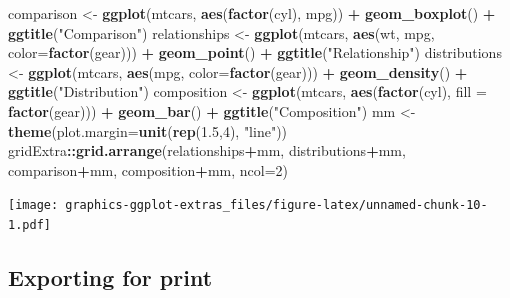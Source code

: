 \documentclass[]{article}
\newenvironment{Shaded}{\begin{snugshade}}{\end{snugshade}}
\newcommand{\DataTypeTok}[1]{\textcolor[rgb]{0.13,0.29,0.53}{#1}}
\newcommand{\DecValTok}[1]{\textcolor[rgb]{0.00,0.00,0.81}{#1}}
\newcommand{\FloatTok}[1]{\textcolor[rgb]{0.00,0.00,0.81}{#1}}
\newcommand{\KeywordTok}[1]{\textcolor[rgb]{0.13,0.29,0.53}{\textbf{#1}}}
\newcommand{\NormalTok}[1]{#1}
\newcommand{\OperatorTok}[1]{\textcolor[rgb]{0.81,0.36,0.00}{\textbf{#1}}}
\newcommand{\StringTok}[1]{\textcolor[rgb]{0.31,0.60,0.02}{#1}}
\begin{document}
\begin{Shaded}
\begin{Highlighting}[]
\NormalTok{comparison <-}\StringTok{ }\KeywordTok{ggplot}\NormalTok{(mtcars, }\KeywordTok{aes}\NormalTok{(}\KeywordTok{factor}\NormalTok{(cyl), mpg)) }\OperatorTok{+}\StringTok{ }\KeywordTok{geom_boxplot}\NormalTok{() }\OperatorTok{+}\StringTok{  }\KeywordTok{ggtitle}\NormalTok{(}\StringTok{"Comparison"}\NormalTok{)}
\NormalTok{relationships <-}\StringTok{ }\KeywordTok{ggplot}\NormalTok{(mtcars, }\KeywordTok{aes}\NormalTok{(wt, mpg, }\DataTypeTok{color=}\KeywordTok{factor}\NormalTok{(gear))) }\OperatorTok{+}\StringTok{ }\KeywordTok{geom_point}\NormalTok{() }\OperatorTok{+}\StringTok{ }\KeywordTok{ggtitle}\NormalTok{(}\StringTok{"Relationship"}\NormalTok{)}
\NormalTok{distributions <-}\StringTok{ }\KeywordTok{ggplot}\NormalTok{(mtcars, }\KeywordTok{aes}\NormalTok{(mpg, }\DataTypeTok{color=}\KeywordTok{factor}\NormalTok{(gear))) }\OperatorTok{+}\StringTok{ }\KeywordTok{geom_density}\NormalTok{() }\OperatorTok{+}\StringTok{ }\KeywordTok{ggtitle}\NormalTok{(}\StringTok{"Distribution"}\NormalTok{)}
\NormalTok{composition <-}\StringTok{ }\KeywordTok{ggplot}\NormalTok{(mtcars, }\KeywordTok{aes}\NormalTok{(}\KeywordTok{factor}\NormalTok{(cyl), }\DataTypeTok{fill =} \KeywordTok{factor}\NormalTok{(gear))) }\OperatorTok{+}\StringTok{ }\KeywordTok{geom_bar}\NormalTok{() }\OperatorTok{+}\StringTok{ }\KeywordTok{ggtitle}\NormalTok{(}\StringTok{"Composition"}\NormalTok{)}
\NormalTok{mm <-}\StringTok{ }\KeywordTok{theme}\NormalTok{(}\DataTypeTok{plot.margin=}\KeywordTok{unit}\NormalTok{(}\KeywordTok{rep}\NormalTok{(}\FloatTok{1.5}\NormalTok{,}\DecValTok{4}\NormalTok{), }\StringTok{"line"}\NormalTok{))}
\NormalTok{gridExtra}\OperatorTok{::}\KeywordTok{grid.arrange}\NormalTok{(relationships}\OperatorTok{+}\NormalTok{mm, distributions}\OperatorTok{+}\NormalTok{mm, comparison}\OperatorTok{+}\NormalTok{mm, composition}\OperatorTok{+}\NormalTok{mm, }\DataTypeTok{ncol=}\DecValTok{2}\NormalTok{)}
\end{Highlighting}
\end{Shaded}

\texttt{[image: graphics-ggplot-extras\_files/figure-latex/unnamed-chunk-10-1.pdf]}

\hypertarget{exporting-graphics}{%
\subsection*{Exporting for print}\label{exporting-graphics}}
\end{document}
